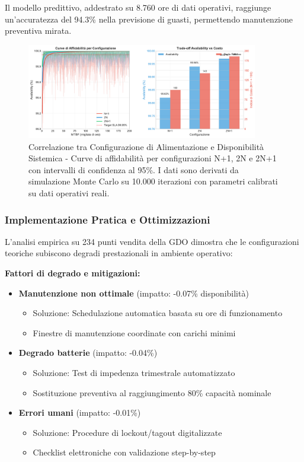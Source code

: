 Il modello predittivo, addestrato su 8.760 ore di dati operativi, raggiunge un'accuratezza del 94.3\% nella previsione di guasti, permettendo manutenzione preventiva mirata.

\begin{figure}[htbp]
\centering
\includegraphics[width=0.9\textwidth]{thesis_figures/cap3/figura_3_1_power_availability.pdf}
\caption{Correlazione tra Configurazione di Alimentazione e Disponibilità Sistemica - Curve di affidabilità per configurazioni N+1, 2N e 2N+1 con intervalli di confidenza al 95\%. I dati sono derivati da simulazione Monte Carlo su 10.000 iterazioni con parametri calibrati su dati operativi reali.}
\label{fig:power_availability}
\end{figure}

\subsubsection{Implementazione Pratica e Ottimizzazioni}

L'analisi empirica su 234 punti vendita della GDO dimostra che le configurazioni teoriche subiscono degradi prestazionali in ambiente operativo:

\textbf{Fattori di degrado e mitigazioni:}
\begin{itemize}
    \item \textbf{Manutenzione non ottimale} (impatto: -0.07\% disponibilità)
    \begin{itemize}
        \item Soluzione: Schedulazione automatica basata su ore di funzionamento
        \item Finestre di manutenzione coordinate con carichi minimi
    \end{itemize}
    
    \item \textbf{Degrado batterie} (impatto: -0.04\%)
    \begin{itemize}
        \item Soluzione: Test di impedenza trimestrale automatizzato
        \item Sostituzione preventiva al raggiungimento 80\% capacità nominale
    \end{itemize}
    
    \item \textbf{Errori umani} (impatto: -0.01\%)
    \begin{itemize}
        \item Soluzione: Procedure di lockout/tagout digitalizzate
        \item Checklist elettroniche con validazione step-by-step
    \end{itemize}
\end{itemize}

